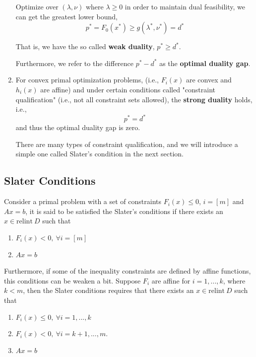 \begin{enumerate}
	Optimize over $(\lambda, \nu)$ where $\lambda \geq 0$ in order to maintain dual feasibility, we can get the greatest lower bound,
	\begin{equation*}
		p^* = F_0(x^*) \geq g(\lambda^*, \nu^*) = d^*
	\end{equation*}
	
	That is, we have the so called \textbf{weak duality}, $p^*\geq d^*$. 
	
	Furthermore, we refer to the difference $p^* - d^*$ as the \textbf{optimal duality gap}.
	
	
	\item For convex primal optimization problems, (i.e., $F_i(x)$ are convex and $h_i(x)$ are affine) and under certain conditions called "constraint qualification" (i.e., not all constraint sets allowed), the \textbf{strong duality} holds, i.e.,
	$$p^* = d^*$$
	and thus the optimal duality gap is zero.
	
	There are many types of constraint qualification, and we will introduce a simple one called Slater's condition in the next section.
	
\end{enumerate}
	


\subsection{Slater Conditions}

\begin{definition}
	Consider a primal problem with a set of constraints $F_i(x)\leq 0$, $i = [m]$ and $Ax = b$, it is said to be satisfied the Slater's conditions if there exists an $x\in\text{relint}\ D$ such that
	
	\begin{enumerate}
		\item $F_i(x) < 0,\ \forall i = [m]$
		
		\item $Ax = b$
	\end{enumerate}
	
	Furthermore, if some of the inequality constraints are defined by affine functions, this conditions can be weaken a bit. Suppose $F_i$ are affine for $i=1,..., k$, where $k<m$, then the Slater conditions requires that there exists an $x\in\text{relint}\ D$ such that
	\begin{enumerate}
		\item $F_i(x) \leq 0,\ \forall i = 1,..., k$
		\item $F_i(x) < 0,\ \forall i = k+1,..., m$.
		\item $Ax = b$
	\end{enumerate}
	
\end{definition}

